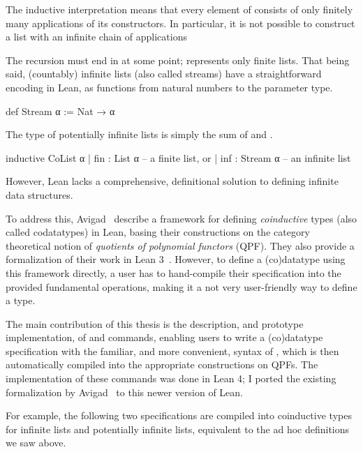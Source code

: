 The inductive interpretation means that every element of  consists of only
finitely many applications of its constructors. In particular, it is not possible
to construct a list with an infinite chain of  applications
\begin{center}
\end{center}
The recursion must end in  at some point;  represents only finite lists.
That being said, (countably) infinite lists (also called streams) have a straightforward encoding in Lean, as functions from natural numbers to the parameter type.
\begin{leancode}
    def Stream α := Nat → α
\end{leancode}

The type of potentially infinite lists is simply the sum of  and .
\begin{leancode}
  inductive CoList α
    | fin : List α      -- a finite list, or
    | inf : Stream α    -- an infinite list
\end{leancode}

However, Lean lacks a comprehensive, definitional solution to defining infinite data structures.

To address this, Avigad \etal{}\ describe a framework for defining \emph{coinductive} types (also called codatatypes) in Lean,
basing their constructions on the category theoretical notion of \emph{quotients of polynomial functors} (QPF).
They also provide a formalization of their work in Lean 3~\cite{avigadDataTypesQuotients2019}.
However, to define a (co)datatype using this framework directly, a user has to hand-compile their specification 
into the provided fundamental operations, making it a not very user-friendly way to define a type.

The main contribution of this thesis is the description, and prototype implementation, of \data{} and \codata{} commands, enabling users to write a (co)datatype specification with the familiar, and more convenient, syntax of \inductive{}, which is then automatically compiled into the appropriate constructions on QPFs.
The implementation of these commands was done in Lean 4; I ported the existing formalization by Avigad \etal\ to this newer version of Lean.


For example, the following two \codata{} specifications are compiled into coinductive types for infinite lists and potentially infinite lists, equivalent to the ad hoc definitions we saw above.


